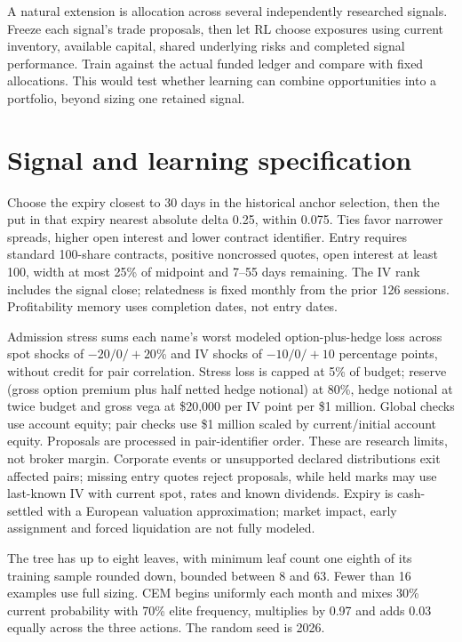 \documentclass[11pt,letterpaper]{article}
\newcommand{\money}[1]{\$#1}
\begin{document}
A natural extension is allocation across several independently researched
signals. Freeze each signal's trade proposals, then let RL choose exposures
using current inventory, available capital, shared underlying risks and
completed signal performance. Train against the actual funded ledger and
compare with fixed allocations. This would test whether learning can combine
opportunities into a portfolio, beyond sizing one retained signal.

\clearpage
\appendix
\footnotesize
\section{Signal and learning specification}
\label{app:implementation}
Choose the expiry closest to 30 days in the historical anchor selection, then
the put in that expiry nearest absolute delta 0.25, within 0.075. Ties favor
narrower spreads, higher open interest and lower contract identifier. Entry
requires standard 100-share contracts, positive noncrossed quotes, open
interest at least 100, width at most 25\% of midpoint and 7--55 days remaining.
The IV rank includes the signal close; relatedness is fixed monthly from the
prior 126 sessions. Profitability memory uses completion dates, not entry dates.

Admission stress sums each name's worst modeled option-plus-hedge loss across
spot shocks of $-20/0/+20$\% and IV shocks of $-10/0/+10$ percentage points,
without credit for pair correlation. Stress loss is capped at 5\% of budget;
reserve (gross option premium plus half netted hedge notional) at 80\%, hedge
notional at twice budget and gross vega at \money{20,000} per IV point per
\money{1 million}. Global checks use account equity; pair checks use
\money{1 million} scaled by current/initial account equity. Proposals are
processed in pair-identifier order. These are research limits, not broker margin.
Corporate events or unsupported declared distributions exit affected pairs;
missing entry quotes reject proposals, while held marks may use last-known IV
with current spot, rates and known dividends. Expiry is cash-settled with a
European valuation approximation; market impact, early assignment and forced
liquidation are not fully modeled.

The tree has up to eight leaves, with minimum leaf count one eighth of its
training sample rounded down, bounded between 8 and 63. Fewer than 16 examples
use full sizing. CEM begins uniformly each month and mixes 30\% current
probability with 70\% elite frequency, multiplies by 0.97 and adds 0.03 equally
across the three actions. The random seed is 2026.
\end{document}
